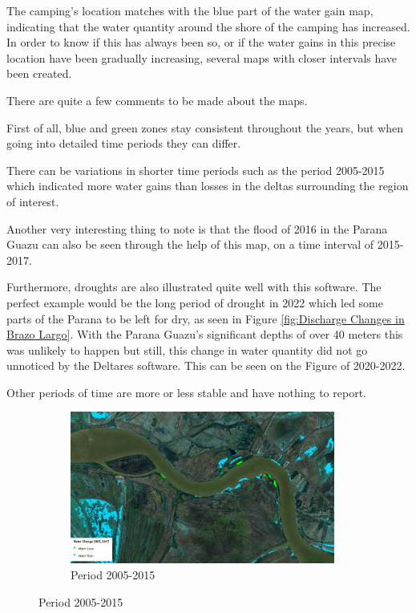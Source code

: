 The camping's location matches with the blue part of the water gain map, indicating that the water quantity around the shore of the camping has increased. 
In order to know if this has always been so, or if the water gains in this precise location have been gradually increasing, several maps with closer intervals have been created. 

There are quite a few comments to be made about the maps. 

First of all, blue and green zones stay consistent throughout the years, but when going into detailed time periods they can differ.

There can be variations in shorter time periods such as the period 2005-2015 which indicated more water gains than losses in the deltas surrounding the region of interest.

Another very interesting thing to note is that the flood of 2016 in the Parana Guazu can also be seen through the help of this map, on a time interval of 2015-2017.

Furthermore, droughts are also illustrated quite well with this software. The perfect example would be the long period of drought in 2022 which led some parts of the Parana to be left for dry, as seen in Figure \ref{fig:Discharge Changes in Brazo Largo}. With the Parana Guazu's significant depths of over 40 meters this was unlikely to happen but still, this change in water quantity did not go unnoticed by the Deltares software. This can be seen on the Figure of 2020-2022.

Other periods of time are more or less stable and have nothing to report.

\begin{figure}[H]
    \centering
    \begin{subfigure}[a]{0.6\textwidth}
        \includegraphics[width=\linewidth, height=5cm]{figures/ch5/2005-2015.jpg}
        \caption{Period 2005-2015}
        \label{fig:Period 2005-2015}
    \end{subfigure}
\end{figure}

